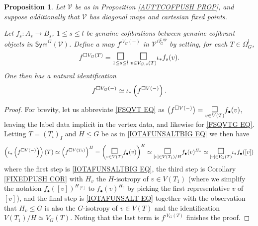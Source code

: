 \documentclass[a4paper,10pt
,draft
]{article}%
\numberwithin{equation}{section}
\numberwithin{figure}{section}
\newtheorem{proposition}[equation]{Proposition}%
\theoremstyle{definition} %
\newcommand{\1}{\ensuremath{\mathbbm 1}}%
\begin{document}
\begin{proposition}\label{FIXPT PROP}
	Let $\mathcal{V}$ be as in Proposition \ref{AUTTCOFPUSH PROP}, and suppose additionally that 
	$\mathcal{V}$ has diagonal maps and cartesian fixed points.

	Let  
	$f_s \colon A_s \to B_s$, $1\leq s \leq l$ be 
	genuine cofibrations between genuine cofibrant objects in 
	$\mathsf{Sym}^G(\mathcal{V})$.
	Define a map
	$f^{\square V_G(-)}$ in
	$\mathcal{V}^{\Omega^{\underline{l},op}_G}$
	by setting, for each $T \in \Omega_{G}^{\underline{l}}$,
\begin{equation}\label{FSQVTG EQ}
		f^{\square V_G(T)} = 
		\underset{1\leq s \leq l}{\mathlarger{\mathlarger{\square}}}
			\phantom{!}
		\underset{v \in V_{G,s}(T)}{\mathlarger{\mathlarger{\square}}}
		\iota_{\**}f_s(v).
\end{equation}
	One then has a natural identification
	\begin{equation}\label{FIXEDPOINT1 EQ}
		f^{\square V_G(-)} \simeq
		\iota_{\**} \left(f^{\square V(-)}\right).
	\end{equation}
\end{proposition}

\begin{proof}
	For brevity, let us abbreviate \eqref{FSQVT EQ} as
	$\left(f^{\square V(-)}\right) = \underset{v \in V(T)}{\mathlarger{\mathlarger{\square}}}
	f_{\bullet}(v)$,
	leaving the label data implicit in the vertex data,
	and likewise for \eqref{FSQVTG EQ}.
	Letting 
	$T = (T_i)_I$ and $H\leq G$ be as in 
	\eqref{IOTAFUNSALTBIG EQ}
	we then have
\[
	\left(\iota_{\**} \left(f^{\square V(-)}\right)\right)(T)
\simeq
	\left(f^{\square V(T_1)}\right)^H
=
	\left(\underset{v \in V(T)}{\mathlarger{\mathlarger{\square}}}
	f_{\bullet}(v)
	\right)^H
\simeq
	\underset{[v] \in V(T_1)/H}{\mathlarger{\mathlarger{\square}}}
	f_{\bullet}(v)^{H_v}
\simeq
	\underset{[v] \in V_G(T)}{\mathlarger{\mathlarger{\square}}}
\iota_{\**}f_{\bullet}([v])
\]
where the first step is 
\eqref{IOTAFUNSALTBIG EQ},
the third step is
Corollary \ref{FIXEDPUSH COR}
with $H_v$
the $H$-isotropy of $v \in V(T_1)$
(where we simplify the notation
$f_{\bullet}([v])^{H_{[v]}}$
to 
$f_{\bullet}(v)^{H_v}$
by picking the first representative $v$ of $[v]$),
and the final step is
\eqref{IOTAFUNSALT EQ}
together with the observation that
$H_v \leq G$
is also the $G$-isotropy of $v \in V(T)$
and the identification
$V(T_1)/H \simeq V_G(T)$.
Noting that the last term is 
$f^{\square V_G(T)}$
finishes the proof.	
\end{proof}
\end{document}
